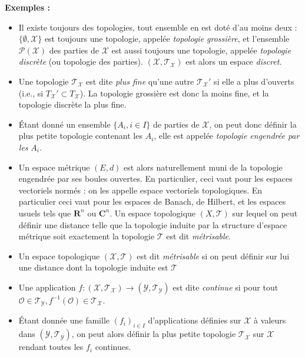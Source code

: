 \documentclass[12pt]{article}
\begin{document}
\textbf{Exemples :} \begin{itemize}

  \item Il existe toujours des topologies, tout ensemble en est doté d'au moins deux : $ \{ \emptyset, \mathcal X \} $ est toujours une topologie, appelée \textit{topologie grossière}, et l'ensemble $\mathcal P(\mathcal X)$ des parties de $\mathcal X $ est aussi toujours une topologie, appelée \textit{topologie discrète} (ou topologie des parties). $ (\mathcal X, \mathcal T_{\mathcal X}) $ est alors un espace \textit{discret}.

  \item Une topologie $ \mathcal T_{\mathcal X} $ est dite \textit{plus fine} qu'une autre $ \mathcal T_{\mathcal X}' $ si elle a plus d'ouverts (i.e., si $T_{\mathcal X}' \subset T_{\mathcal X}$). La topologie grossière est donc la moins fine, et la topologie discrète la plus fine.

  \item Étant donné un ensemble $\{ A_i, i \in I \}$ de parties de $\mathcal X$, on peut donc définir la plus petite topologie contenant les $A_i$, elle est appelée \textit{topologie engendrée par les} $A_i$.

  \item Un espace métrique $(E,d)$ est alors naturellement muni de la topologie engendrée par ses boules ouvertes. En particulier, ceci vaut pour les espaces vectoriels normés : on les appelle espace vectoriels topologiques. En particulier ceci vaut pour les espaces de Banach, de Hilbert, et les espaces usuels tels que $\mathbf R^n $ ou $ \mathbf C^n $. Un espace topologique $(X,\mathcal T)$ sur lequel on peut définir une distance telle que la topologie induite par la structure d'espace métrique soit exactement la topologie $\mathcal T$ est dit \textit{métrisable}. 

  \item Un espace topologique $ (\mathcal X, \mathcal T) $ est dit \textit{métrisable} si on peut définir sur lui une distance dont la topologie induite est $ \mathcal T $

  \item Une application $ f : (\mathcal X, \mathcal T_{\mathcal X}) \to (\mathcal Y, \mathcal T_{\mathcal Y}) $ est dite \textit{continue} si pour tout $ \mathcal O \in \mathcal T_{\mathcal Y}, f^{-1}(\mathcal O) \in \mathcal T_{\mathcal X} $.

  \item Étant donnée une famille $ (f_i)_{i\in I} $ d'applications définies sur $\mathcal X$ à valeurs dans $(\mathcal Y, \mathcal T_{\mathcal Y}) $, on peut alors définir la plus petite topologie $\mathcal T_{\mathcal X}$ sur $ \mathcal X $ rendant toutes les $f_i$ continues. 


\end{itemize}
\end{document}
